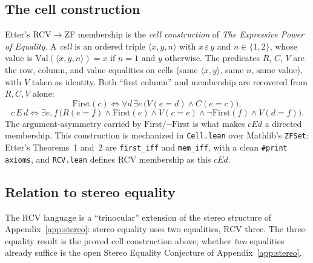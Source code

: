 \documentclass{ws-rv9x6}
\theoremstyle{remark}
\begin{document}
\begin{appendices}
\subsection{The cell construction}

Etter's RCV$\to$ZF membership is the \emph{cell construction} of \emph{The Expressive Power of Equality}\cite{etter_power}. A \emph{cell} is an ordered triple $\langle x, y, n\rangle$ with $x \,\varepsilon\, y$ and $n \in \{1, 2\}$, whose value is $\mathrm{Val}(\langle x, y, n\rangle) = x$ if $n = 1$ and $y$ otherwise. The predicates $R$, $C$, $V$ are the row, column, and value equalities on cells (same $\langle x, y\rangle$, same $n$, same value), with $V$ taken as identity. Both ``first column'' and membership are recovered from $R, C, V$ alone:
\[ \mathrm{First}(c) \iff \forall d\,\exists e\,\bigl(V(e{=}d) \land C(e{=}c)\bigr), \]
\[ c\,E\,d \iff \exists e, f\,\bigl(R(e{=}f) \land \mathrm{First}(e) \land V(c{=}e) \land \neg\mathrm{First}(f) \land V(d{=}f)\bigr). \]
The argument-asymmetry carried by $\mathrm{First}/\neg\mathrm{First}$ is what makes $cEd$ a directed membership. This construction is mechanized in \texttt{Cell.lean} over Mathlib's \texttt{ZFSet}: Etter's Theorems~1 and~2 are \texttt{first\_iff} and \texttt{mem\_iff}, with a clean \texttt{\#print axioms}, and \texttt{RCV.lean} defines RCV membership as this $cEd$.

\subsection{Relation to stereo equality}

The RCV language is a ``trinocular'' extension of the stereo structure of Appendix~\ref{app:stereo}: stereo equality uses two equalities, RCV three. The three-equality result is the proved cell construction above; whether \emph{two} equalities already suffice is the open Stereo Equality Conjecture of Appendix~\ref{app:stereo}.

\end{appendices}
\end{document}
